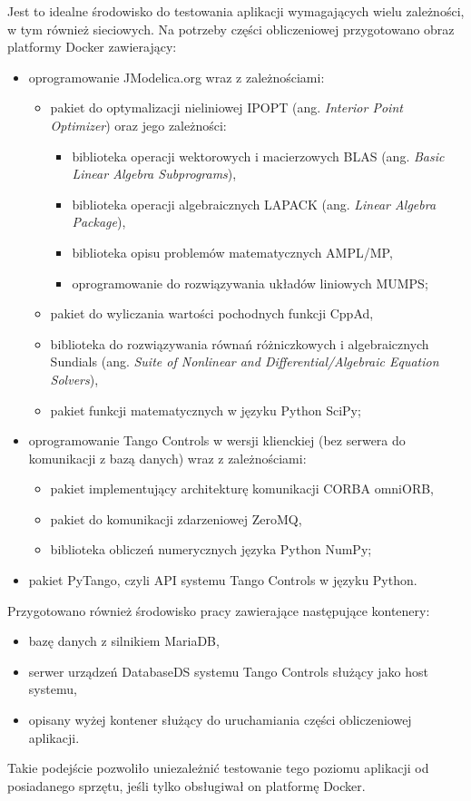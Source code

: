Jest to idealne środowisko do testowania aplikacji wymagających wielu zależności, w tym również sieciowych. Na potrzeby części obliczeniowej przygotowano obraz platformy Docker zawierający:
\begin{itemize}
    \item oprogramowanie JModelica.org wraz z zależnościami:
    \begin{itemize}
        \item pakiet do optymalizacji nieliniowej IPOPT (ang. \emph{Interior Point Optimizer}) oraz jego zależności:
        \begin{itemize}
            \item biblioteka operacji wektorowych i macierzowych BLAS (ang. \emph{Basic Linear Algebra Subprograms}),
            \item biblioteka operacji algebraicznych LAPACK (ang. \emph{Linear Algebra Package}),
            \item biblioteka opisu problemów matematycznych AMPL/MP,
            \item oprogramowanie do rozwiązywania układów liniowych MUMPS;
        \end{itemize}
        \item pakiet do wyliczania wartości pochodnych funkcji CppAd,
        \item biblioteka do rozwiązywania równań różniczkowych i algebraicznych Sundials (ang. \emph{Suite of Nonlinear and Differential/Algebraic Equation Solvers}),
        \item pakiet funkcji matematycznych w języku Python SciPy;
    \end{itemize}
    \item oprogramowanie Tango Controls w wersji klienckiej (bez serwera do komunikacji z bazą danych) wraz z zależnościami:
    \begin{itemize}
        \item pakiet implementujący architekturę komunikacji CORBA omniORB,
        \item pakiet do komunikacji zdarzeniowej ZeroMQ,
        \item biblioteka obliczeń numerycznych języka Python NumPy;
    \end{itemize}
    \item pakiet PyTango, czyli API systemu Tango Controls w języku Python.
\end{itemize}

Przygotowano również środowisko pracy zawierające następujące kontenery:
\begin{itemize}
    \item bazę danych z silnikiem MariaDB,
    \item serwer urządzeń DatabaseDS systemu Tango Controls służący jako host systemu,
    \item opisany wyżej kontener służący do uruchamiania części obliczeniowej aplikacji.
\end{itemize}

Takie podejście pozwoliło uniezależnić testowanie tego poziomu aplikacji od posiadanego sprzętu, jeśli tylko obsługiwał on platformę Docker.